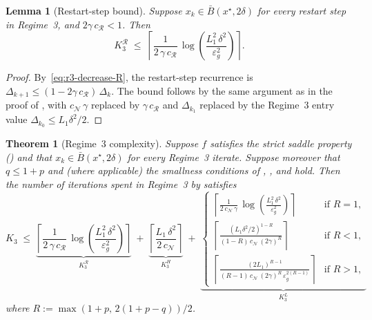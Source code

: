 \documentclass[11pt,a4paper]{article}
\theoremstyle{plain}
\newtheorem{theorem}{Theorem}
\newtheorem{lemma}{Lemma}
\theoremstyle{definition}
\newcommand{\eps}{\varepsilon}
\newcommand{\epsg}{\eps_{g}}
\newcommand{\xstar}{x^{\star}}
\newcommand{\Lone}{L_{1}}
\newcommand{\setN}{\mathcal{N}}
\newcommand{\setR}{\mathcal{R}}
\newcommand{\cN}{c_{\setN}}
\begin{document}
\begin{lemma}[Restart-step bound]\label{lem:r3-restart}
Suppose $x_{k} \in \bar B(\xstar, 2\delta)$ for every restart step in Regime~3, and $2\gamma\,c_{\setR} < 1$. Then
\begin{equation}\label{eq:r3-restart-bound}
K_{3}^{\setR} \;\leq\; \left\lceil \frac{1}{2\,\gamma\,c_{\setR}}\,\log\!\left(\frac{\Lone^{2}\,\delta^{2}}{\epsg^{2}}\right) \right\rceil.
\end{equation}
\end{lemma}

\begin{proof}
By~\eqref{eq:r3-decrease-R}, the restart-step recurrence is $\Delta_{k+1} \leq (1 - 2\gamma\,c_{\setR})\,\Delta_{k}$. The bound follows by the same argument as in the proof of , with $\cN\,\gamma$ replaced by $\gamma\,c_{\setR}$ and $\Delta_{k_{1}}$ replaced by the Regime~3 entry value $\Delta_{k_{0}} \leq \Lone\delta^{2}/2$.
\end{proof}

\begin{theorem}[Regime~3 complexity]\label{thm:regime3}
Suppose $f$ satisfies the strict saddle property () and that $x_{k} \in \bar B(\xstar, 2\delta)$ for every Regime~3 iterate. Suppose moreover that $q \leq 1+p$ and (where applicable) the smallness conditions of , , and  hold. Then the number of iterations spent in Regime~3 by  satisfies
\begin{equation}\label{eq:K3-total}
K_{3} \;\leq\; \underbrace{\left\lceil \frac{1}{2\,\gamma\,c_{\setR}}\,\log\!\left(\frac{\Lone^{2}\,\delta^{2}}{\epsg^{2}}\right) \right\rceil}_{K_{3}^{\setR}}
\;+\;
\underbrace{\left\lceil \frac{\Lone\,\delta^{2}}{2\,\cN} \right\rceil}_{K_{3}^{H}}
\;+\;
\underbrace{
\begin{cases}
\displaystyle \left\lceil \frac{1}{2\,\cN\,\gamma}\,\log\!\left(\frac{\Lone^{2}\,\delta^{2}}{\epsg^{2}}\right) \right\rceil
& \text{if } R = 1,\\[1.2em]
\displaystyle \left\lceil \frac{(\Lone\delta^{2}/2)^{1-R}}{(1-R)\,\cN\,(2\gamma)^{R}} \right\rceil
& \text{if } R < 1,\\[1.2em]
\displaystyle \left\lceil \frac{(2\Lone)^{R-1}}{(R-1)\,\cN\,(2\gamma)^{R}\,\epsg^{2(R-1)}} \right\rceil
& \text{if } R > 1,
\end{cases}}_{K_{3}^{L}}
\end{equation}
where $R := \max(1+p,\,2(1+p-q))/2$.
\end{theorem}
\end{document}
